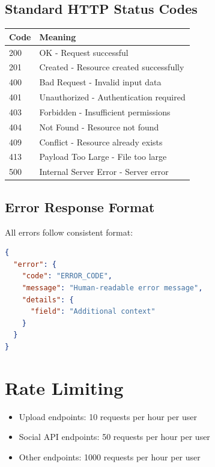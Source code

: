 \subsection{Standard HTTP Status Codes}

\begin{table}[h]
\centering
\begin{tabular}{|l|l|}
\hline
\textbf{Code} & \textbf{Meaning} \\
\hline
200 & OK - Request successful \\
201 & Created - Resource created successfully \\
400 & Bad Request - Invalid input data \\
401 & Unauthorized - Authentication required \\
403 & Forbidden - Insufficient permissions \\
404 & Not Found - Resource not found \\
409 & Conflict - Resource already exists \\
413 & Payload Too Large - File too large \\
500 & Internal Server Error - Server error \\
\hline
\end{tabular}
\end{table}

\subsection{Error Response Format}

All errors follow consistent format:

\begin{lstlisting}[language=JSON]
{
  "error": {
    "code": "ERROR_CODE",
    "message": "Human-readable error message",
    "details": {
      "field": "Additional context"
    }
  }
}
\end{lstlisting}

\section{Rate Limiting}

\begin{itemize}
    \item Upload endpoints: 10 requests per hour per user
    \item Social API endpoints: 50 requests per hour per user
    \item Other endpoints: 1000 requests per hour per user
\end{itemize}

